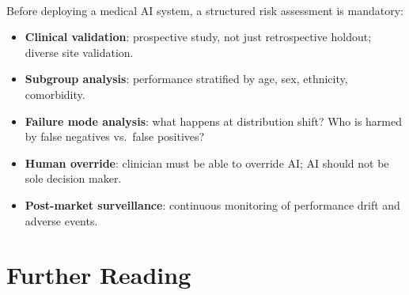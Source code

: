 \begin{tcbitemize}[ skin=sectionraster ]
    \tcbitem[title={Responsible AI Deployment Checklist}, raster multicolumn=3]
    Before deploying a medical AI system, a structured risk assessment is mandatory\textsuperscript{\cite[][pp.~2025--2027]{mccradddenPatientSafetyQuality2020}}:
    \begin{itemize}
        \item \textbf{Clinical validation}: prospective study, not just retrospective holdout; diverse site validation.
        \item \textbf{Subgroup analysis}: performance stratified by age, sex, ethnicity, comorbidity.
        \item \textbf{Failure mode analysis}: what happens at distribution shift? Who is harmed by false negatives vs.\ false positives?
        \item \textbf{Human override}: clinician must be able to override AI; AI should not be sole decision maker.
        \item \textbf{Post-market surveillance}: continuous monitoring of performance drift and adverse events.
    \end{itemize}
\end{tcbitemize}

\section{Further Reading}

